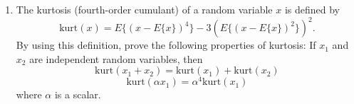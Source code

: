 \begin{enumerate}
  
\item The kurtosis (fourth-order cumulant) of a random variable $x$ is
  defined by
  \begin{displaymath}
    \mathrm{kurt}(x) = E\{(x-E\{x\})^4\}-3(E\{(x-E\{x\})^2\})^2 .
  \end{displaymath}
  By using this definition, prove the following properties of
  kurtosis: If $x_1$ and $x_2$ are independent random variables, then
    \begin{displaymath}
      \mathrm{kurt}(x_1 + x_2) = \mathrm{kurt}(x_1) + \mathrm{kurt}(x_2)
    \end{displaymath}
    \begin{displaymath}
      \mathrm{kurt}(\alpha x_1) = \alpha^4 \mathrm{kurt}(x_1)
    \end{displaymath}
    where $\alpha$ is a scalar.
  
  \begin{solution}


\end{solution}
\end{enumerate}
